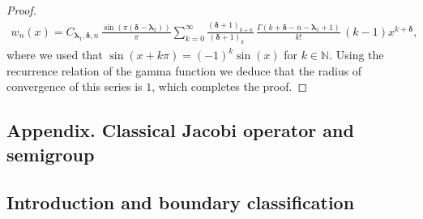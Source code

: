 \documentclass[10pt]{amsart}
\theoremstyle{plain}
\theoremstyle{definition}
\newcommand{\N}{\mathbb{N}}
\newcommand{\lam}{{\bm{\lambda}_1}}
\newcommand{\mm}{{\bm{\delta}}}
\begin{document}
\begin{proof}
\begin{align*}
w_n(x) = C_{\lam, \mm, n}\, \frac{\sin(\pi(\mm-\lam))}{\pi} \sum_{k = 0}^{\infty} \frac{(\mm+1)_{k+n}}{(\mm+1)_{k\phantom{+n}}}\, \frac{\Gamma(k+\mm-n-\lam+1)}{k!}\,(k-1) x^{k+\mm},
\end{align*}
where we used that $\sin(x+k\pi) = (-1)^k\sin(x)$ for $k \in \N$. Using the recurrence relation of the gamma function we deduce that the radius of convergence of this series is $1$, which completes the proof.
\end{proof}

\begin{appendix}
\section*{Appendix. Classical Jacobi operator and semigroup}
\label{sec:classical-Jacobi}

\subsection{Introduction and boundary classification}


\end{appendix}
\end{document}
